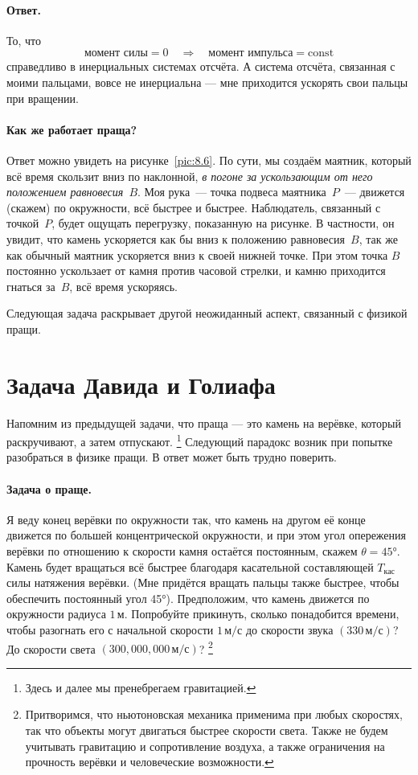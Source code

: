 \paragraph{Ответ.} То, что
\[
\text{момент силы}=0 \quad\Rightarrow\quad \text{момент импульса}=\text{const}
\]
справедливо в инерциальных системах отсчёта.
А система отсчёта, связанная с моими пальцами,
вовсе не инерциальна ---  мне приходится ускорять свои пальцы при вращении.

\paragraph{Как же работает праща?}
Ответ можно увидеть на рисунке~\ref{pic:8.6}.
По сути, мы создаём маятник, который всё время скользит вниз по наклонной, \emph{в погоне за ускользающим от него положением равновесия~$B$}.
Моя рука~--- точка подвеса маятника~$P$~--- движется (скажем) по окружности,
всё быстрее и быстрее.
Наблюдатель, связанный с точкой~$P$, будет ощущать перегрузку, показанную на рисунке.
В частности, он увидит, что камень ускоряется как бы вниз к положению равновесия~$B$,
так же как обычный маятник ускоряется вниз к своей нижней точке.
При этом точка $B$ постоянно ускользает от камня против часовой стрелки, и камню приходится гнаться за~$B$, всё время ускоряясь.

Следующая задача раскрывает другой неожиданный аспект, связанный с физикой пращи.

\section{Задача Давида и Голиафа}\label{Задача Давида и Голиафа}

Напомним из предыдущей задачи, что праща --- это камень на верёвке, который раскручивают, а затем отпускают.%
\footnote{Здесь и далее мы пренебрегаем гравитацией.}
Следующий парадокс возник при попытке разобраться в физике пращи.
В ответ может быть трудно поверить.

\paragraph{Задача о праще.}
Я веду конец верёвки по окружности так, что камень на другом её конце движется
по большей концентрической окружности, и при этом угол опережения верёвки по отношению к скорости камня остаётся постоянным, скажем $\theta=45$°.
Камень будет вращаться всё быстрее благодаря касательной составляющей
$T_{\text{кас}}$ силы натяжения верёвки.
(Мне придётся вращать пальцы также быстрее, чтобы обеспечить постоянный угол 45°).
Предположим, что камень движется по окружности радиуса $1 \,\text{м}$.
Попробуйте прикинуть, сколько понадобится времени,
чтобы разогнать его с начальной скорости $1 \,\text{м/с}$
до скорости звука $(330 \,\text{м/с})$?
До скорости света $(300{,}000{,}000 \,\text{м/с})$?%
\footnote{Притворимся, что ньютоновская механика применима при любых скоростях, так что объекты могут двигаться быстрее скорости света.
Также не будем учитывать гравитацию и сопротивление воздуха, а также ограничения на прочность верёвки и человеческие возможности.}

